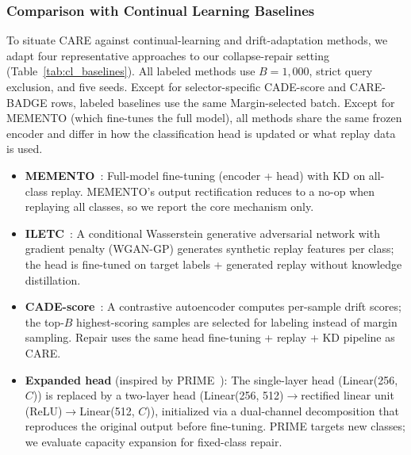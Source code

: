 \documentclass[preprint,12pt,authoryear]{elsarticle}
\let\cite\citep
\newcommand{\ours}{CARE}  %
\begin{document}
\subsubsection{Comparison with Continual Learning Baselines}
\label{sec:cl_baselines}

To situate \ours{} against continual-learning and drift-adaptation methods, we adapt four representative approaches to our collapse-repair setting (Table~\ref{tab:cl_baselines}).
All labeled methods use $B{=}1{,}000$, strict query exclusion, and five seeds. Except for selector-specific CADE-score and \ours{}-BADGE rows, labeled baselines use the same Margin-selected batch. Except for MEMENTO (which fine-tunes the full model), all methods share the same frozen encoder and differ in how the classification head is updated or what replay data is used.

\begin{itemize}
  \item \textbf{MEMENTO}~\cite{cerasuolo2024memento}: Full-model fine-tuning (encoder + head) with KD on all-class replay. MEMENTO's output rectification reduces to a no-op when replaying all classes, so we report the core mechanism only.
  \item \textbf{ILETC}~\cite{zhu2023iletc}: A conditional Wasserstein generative adversarial network with gradient penalty (WGAN-GP) generates synthetic replay features per class; the head is fine-tuned on target labels + generated replay without knowledge distillation.
  \item \textbf{CADE-score}~\cite{yang2021cade}: A contrastive autoencoder computes per-sample drift scores; the top-$B$ highest-scoring samples are selected for labeling instead of margin sampling. Repair uses the same head fine-tuning + replay + KD pipeline as \ours{}.
  \item \textbf{Expanded head} (inspired by PRIME~\cite{prime2025}): The single-layer head (Linear(256, $C$)) is replaced by a two-layer head (Linear(256, 512)$\to$rectified linear unit (ReLU)$\to$Linear(512, $C$)), initialized via a dual-channel decomposition that reproduces the original output before fine-tuning. PRIME targets new classes; we evaluate capacity expansion for fixed-class repair.
\end{itemize}
\end{document}

